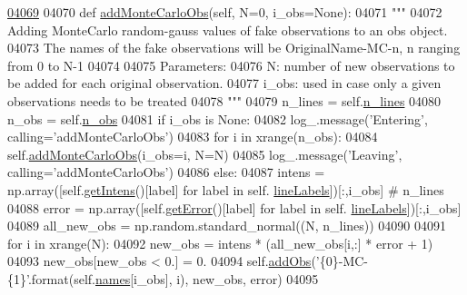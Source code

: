 \begin{DoxyCode}
\hypertarget{classpyneb_1_1core_1_1pynebcore_1_1_observation_l04069}{}\hyperlink{classpyneb_1_1core_1_1pynebcore_1_1_observation_a8005a1ad8167e96e117d4b81d6e919ff}{04069} 
04070     \textcolor{keyword}{def }\hyperlink{classpyneb_1_1core_1_1pynebcore_1_1_observation_a8005a1ad8167e96e117d4b81d6e919ff}{addMonteCarloObs}(self, N=0, i\_obs=None):
04071         \textcolor{stringliteral}{"""}
04072 \textcolor{stringliteral}{        Adding MonteCarlo random-gauss values of fake observations to an obs object.}
04073 \textcolor{stringliteral}{        The names of the fake observations will be OriginalName-MC-n, n ranging from 0 to N-1}
04074 \textcolor{stringliteral}{        }
04075 \textcolor{stringliteral}{        Parameters:}
04076 \textcolor{stringliteral}{        N: number of new observations to be added for each original observation.}
04077 \textcolor{stringliteral}{        i\_obs: used in case only a given observations needs to be treated}
04078 \textcolor{stringliteral}{        """}
04079         n\_lines = self.\hyperlink{classpyneb_1_1core_1_1pynebcore_1_1_observation_a784301f3cabf9c7dbe4e7dcef0700ae8}{n\_lines}
04080         n\_obs = self.\hyperlink{classpyneb_1_1core_1_1pynebcore_1_1_observation_a3c9122167ef525b73a62d39d4b5c4239}{n\_obs}
04081         \textcolor{keywordflow}{if} i\_obs \textcolor{keywordflow}{is} \textcolor{keywordtype}{None}:
04082             log\_.message(\textcolor{stringliteral}{'Entering'}, calling=\textcolor{stringliteral}{'addMonteCarloObs'})
04083             \textcolor{keywordflow}{for} i \textcolor{keywordflow}{in} xrange(n\_obs):
04084                 self.\hyperlink{classpyneb_1_1core_1_1pynebcore_1_1_observation_a8005a1ad8167e96e117d4b81d6e919ff}{addMonteCarloObs}(i\_obs=i, N=N)
04085             log\_.message(\textcolor{stringliteral}{'Leaving'}, calling=\textcolor{stringliteral}{'addMonteCarloObs'})
04086         \textcolor{keywordflow}{else}:
04087             intens = np.array([self.\hyperlink{classpyneb_1_1core_1_1pynebcore_1_1_observation_ac380b22660411926b90f935f5123494b}{getIntens}()[label] \textcolor{keywordflow}{for} label \textcolor{keywordflow}{in} self.
      \hyperlink{classpyneb_1_1core_1_1pynebcore_1_1_observation_a6ec53301ec68e138d4347f501ff7f711}{lineLabels}])[:,i\_obs] \textcolor{comment}{# n\_lines}
04088             error = np.array([self.\hyperlink{classpyneb_1_1core_1_1pynebcore_1_1_observation_a96cf2360b9b568a675d2c8177d47b3d2}{getError}()[label] \textcolor{keywordflow}{for} label \textcolor{keywordflow}{in} self.
      \hyperlink{classpyneb_1_1core_1_1pynebcore_1_1_observation_a6ec53301ec68e138d4347f501ff7f711}{lineLabels}])[:,i\_obs]
04089             all\_new\_obs = np.random.standard\_normal((N, n\_lines))
04090             
04091             \textcolor{keywordflow}{for} i \textcolor{keywordflow}{in} xrange(N):
04092                 new\_obs = intens * (all\_new\_obs[i,:] * error + 1)
04093                 new\_obs[new\_obs < 0.] = 0.
04094                 self.\hyperlink{classpyneb_1_1core_1_1pynebcore_1_1_observation_a301e67ff50a467e97cd929039607a5d0}{addObs}(\textcolor{stringliteral}{'\{0\}-MC-\{1\}'}.format(self.\hyperlink{classpyneb_1_1core_1_1pynebcore_1_1_observation_a3f365d0b1488b2eba300bf71caf23c17}{names}[i\_obs], i), new\_obs, error)
04095     
\end{DoxyCode}
